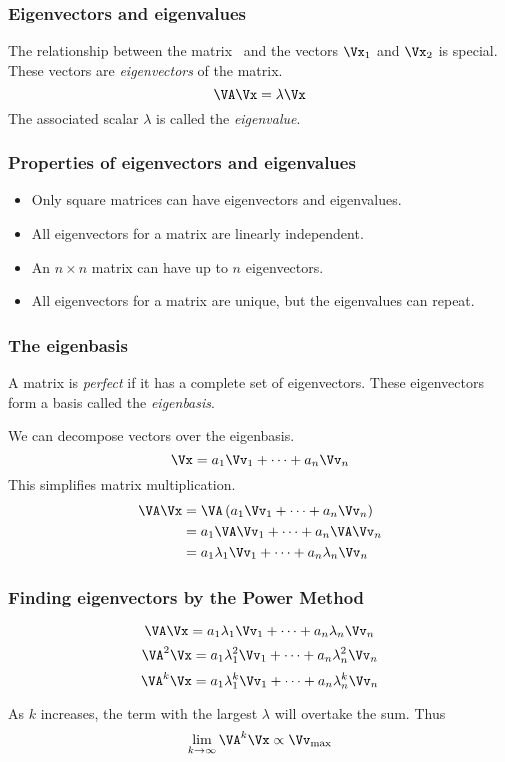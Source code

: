 \documentclass{beamer}
\begin{document}
\begin{frame}
\frametitle{Eigenvectors and eigenvalues}

The relationship between the matrix \VA\ and the vectors $\Vx_1$ and $\Vx_2$ is special. These vectors are \emph{eigenvectors} of the matrix.
\[ \VA\Vx = \lambda\Vx \]
The associated scalar $\lambda$ is called the \emph{eigenvalue}.
\end{frame}

\begin{frame}
\frametitle{Properties of eigenvectors and eigenvalues}
\begin{itemize}
	\item Only square matrices can have eigenvectors and eigenvalues.
	\item All eigenvectors for a matrix are linearly independent.
	\item An $n\times n$ matrix can have up to $n$ eigenvectors.
	\item All eigenvectors for a matrix are unique, but the eigenvalues can repeat.
\end{itemize}
\end{frame}

\begin{frame}
\frametitle{The eigenbasis}

A matrix is \emph{perfect} if it has a complete set of eigenvectors. These eigenvectors form a basis called the \emph{eigenbasis}.

\bigskip
We can decompose vectors over the eigenbasis.
\[ \Vx = a_1\Vv_1 + \cdots + a_n\Vv_n \]
This simplifies matrix multiplication.
\begin{align*}
	 \VA\Vx &= \VA\left(a_1\Vv_1 + \cdots + a_n\Vv_n\right) \\
		&= a_1\VA\Vv_1 + \cdots + a_n\VA\Vv_n \\
		&= a_1\lambda_1\Vv_1 + \cdots + a_n\lambda_n\Vv_n
\end{align*}

\end{frame}

\begin{frame}
\frametitle{Finding eigenvectors by the Power Method}

\[ \VA\Vx = a_1\lambda_1\Vv_1 + \cdots + a_n\lambda_n\Vv_n \]
\[ \VA^2\Vx = a_1\lambda_1^2\Vv_1 + \cdots + a_n\lambda_n^2\Vv_n \]
\[ \VA^k\Vx = a_1\lambda_1^k\Vv_1 + \cdots + a_n\lambda_n^k\Vv_n \]

\bigskip
\pause
As $k$ increases, the term with the largest $\lambda$ will overtake the sum. Thus
\[ \lim_{k\rightarrow\infty} \VA^k\Vx \propto \Vv_\mathrm{max} \]
\end{frame}
\end{document}
